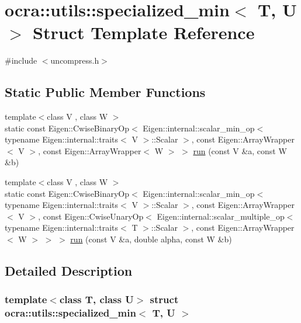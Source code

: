 \hypertarget{structocra_1_1utils_1_1specialized__min}{}\section{ocra\+:\+:utils\+:\+:specialized\+\_\+min$<$ T, U $>$ Struct Template Reference}
\label{structocra_1_1utils_1_1specialized__min}


{\ttfamily \#include $<$uncompress.\+h$>$}

\subsection*{Static Public Member Functions}
\begin{DoxyCompactItemize}
\item 
{\footnotesize template$<$class V , class W $>$ }\\static const Eigen\+::\+Cwise\+Binary\+Op$<$ Eigen\+::internal\+::scalar\+\_\+min\+\_\+op$<$ typename Eigen\+::internal\+::traits$<$ V $>$\+::Scalar $>$, const Eigen\+::\+Array\+Wrapper$<$ V $>$, const Eigen\+::\+Array\+Wrapper$<$ W $>$ $>$ \hyperlink{structocra_1_1utils_1_1specialized__min_a8ccdfb97b3ade7ea2043fd608c8bade5}{run} (const V \&a, const W \&b)
\item 
{\footnotesize template$<$class V , class W $>$ }\\static const Eigen\+::\+Cwise\+Binary\+Op$<$ Eigen\+::internal\+::scalar\+\_\+min\+\_\+op$<$ typename Eigen\+::internal\+::traits$<$ V $>$\+::Scalar $>$, const Eigen\+::\+Array\+Wrapper$<$ V $>$, const Eigen\+::\+Cwise\+Unary\+Op$<$ Eigen\+::internal\+::scalar\+\_\+multiple\+\_\+op$<$ typename Eigen\+::internal\+::traits$<$ T $>$\+::Scalar $>$, const Eigen\+::\+Array\+Wrapper$<$ W $>$ $>$ $>$ \hyperlink{structocra_1_1utils_1_1specialized__min_aeb9da860eb661e340840d81bc5b5202a}{run} (const V \&a, double alpha, const W \&b)
\end{DoxyCompactItemize}


\subsection{Detailed Description}
\subsubsection*{template$<$class T, class U$>$\newline
struct ocra\+::utils\+::specialized\+\_\+min$<$ T, U $>$}




